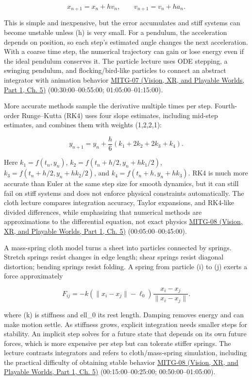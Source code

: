\[
x_{n+1}=x_n+h v_n,\qquad v_{n+1}=v_n+h a_n.
\]

This is simple and inexpensive, but the error accumulates and stiff systems can become unstable unless (h) is very small. For a pendulum, the acceleration depends on position, so each step's estimated angle changes the next acceleration. With a coarse time step, the numerical trajectory can gain or lose energy even if the ideal pendulum conserves it. The particle lecture uses ODE stepping, a swinging pendulum, and flocking/bird-like particles to connect an abstract integrator with animation behavior \href{../07-Vision-XR-and-Playable-Worlds-P01/main.pdf\#nameddest=04-visual-computing-ii-ch036-mitg-07---particle-systems}{MITG-07 (Vision, XR, and Playable Worlds, Part 1, Ch. 5)} (00:30:00--00:55:00; 01:05:00--01:15:00).

More accurate methods sample the derivative multiple times per step. Fourth-order Runge--Kutta (RK4) uses four slope estimates, including mid-step estimates, and combines them with weights (1,2,2,1):

\[
y_{n+1}=y_n+\frac{h}{6}(k_1+2k_2+2k_3+k_4).
\]

Here \(k_1=f(t_n,y_n)\), \(k_2=f(t_n+h/2,y_n+hk_1/2)\), \(k_3=f(t_n+h/2,y_n+hk_2/2)\), and \(k_4=f(t_n+h,y_n+hk_3)\). RK4 is much more accurate than Euler at the same step size for smooth dynamics, but it can still fail on stiff systems and does not enforce physical constraints automatically. The cloth lecture compares integration accuracy, Taylor expansions, and RK4-like divided differences, while emphasizing that numerical methods are approximations to the differential equation, not exact physics \href{../07-Vision-XR-and-Playable-Worlds-P01/main.pdf\#nameddest=04-visual-computing-ii-ch036-mitg-08---cloth-simulation}{MITG-08 (Vision, XR, and Playable Worlds, Part 1, Ch. 5)} (00:05:00--00:45:00).

A mass-spring cloth model turns a sheet into particles connected by springs. Stretch springs resist changes in edge length; shear springs resist diagonal distortion; bending springs resist folding. A spring from particle (i) to (j) exerts a force approximately

\[
F_{ij}=-k(\|x_i-x_j\|-\ell_0)\frac{x_i-x_j}{\|x_i-x_j\|}.
\]

where (k) is stiffness and ell\_0 its rest length. Damping removes energy and can make motion settle. As stiffness grows, explicit integration needs smaller steps for stability. An implicit step solves for a future state that depends on its own future forces, which is more expensive per step but can tolerate stiffer springs. The lecture contrasts integrators and refers to cloth/mass-spring simulation, including the practical difficulty of obtaining stable behavior \href{../07-Vision-XR-and-Playable-Worlds-P01/main.pdf\#nameddest=04-visual-computing-ii-ch036-mitg-08---cloth-simulation}{MITG-08 (Vision, XR, and Playable Worlds, Part 1, Ch. 5)} (00:15:00--00:25:00; 00:50:00--01:05:00).

